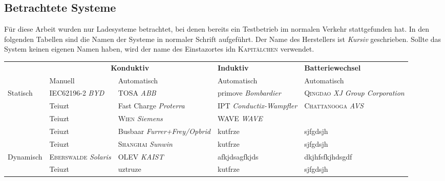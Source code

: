 \documentclass[twoside]{scrartcl}
\begin{document}
\subsection{Betrachtete Systeme}
Für diese Arbeit wurden nur Ladesysteme betrachtet, bei denen bereits ein Testbetrieb im normalen Verkehr stattgefunden hat. In den folgenden Tabellen sind die Namen der Systeme in normaler Schrift aufgeführt. Der Name des Herstellers ist \emph{Kursiv} geschrieben. Sollte das System keinen eigenen Namen haben, wird der name des Einstazortes idn \textsc{Kapitälchen} verwendet.
\begin{table}[htbp]\centering %
	\begin{tabularx}{\linewidth}{lXXXX}
		\toprule
		                           &                 \multicolumn{2}{c}{\textbf{Konduktiv}}                 & \textbf{Induktiv}             & \textbf{Batteriewechsel}                     \\
		\cmidrule{2-3}             & Manuell                            & Automatisch                       & Automatisch                   & Automatisch                                  \\ \midrule
		\multirow{5}{*}{Statisch}  & IEC62196-2 \emph{BYD}              & TOSA \emph{ABB}                   & primove \emph{Bombardier}     & \textsc{Qingdao} \emph{XJ Group Corporation} \\
		                           & Teiuzt                             & Fast Charge \emph{Proterra}       & IPT \emph{Conductix-Wampfler} & \textsc{Chattanooga} \emph{AVS}              \\
		                           & Teiuzt                             & \textsc{Wien} \emph{Siemens}      & WAVE \emph{WAVE}              &  \\
		                           & Teiuzt                             & Busbaar \emph{Furrer+Frey/Opbrid} & kutfrze                       & sjfgdsjh                                     \\
		                           & Teiuzt                             & \textsc{Shanghai} \emph{Sunwin}   & kutfrze                       & sjfgdsjh                                     \\ \midrule
		\multirow{5}{*}{Dynamisch} & \textsc{Eberswalde} \emph{Solaris} & OLEV \emph{KAIST}                 & afkjdsagfkjds                 & dkjhfsfkjhdsgdf                              \\
		                           & Teiuzt                             & uztruze                           & kutfrze                       & sjfgdsjh                                     \\

\end{tabularx}
\end{table}
\end{document}
